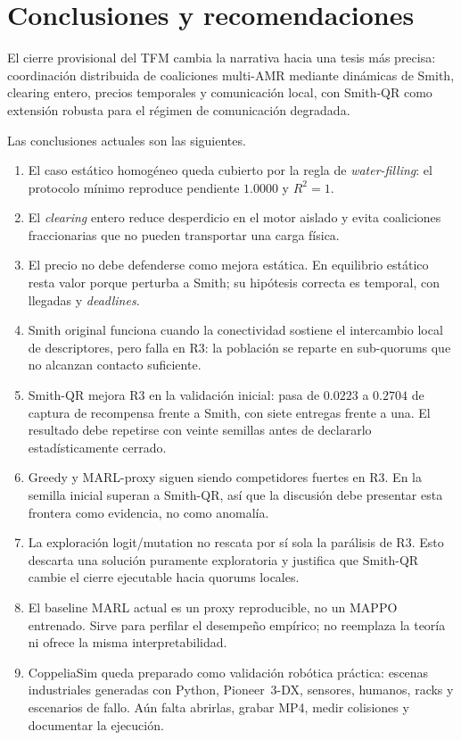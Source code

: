 \section{Conclusiones y recomendaciones}
\label{sec:conclusiones}

El cierre provisional del TFM cambia la narrativa hacia una tesis más precisa:
coordinación distribuida de coaliciones multi-AMR mediante dinámicas de Smith, clearing
entero, precios temporales y comunicación local, con Smith-QR como extensión robusta
para el régimen de comunicación degradada.

Las conclusiones actuales son las siguientes.

\begin{enumerate}
  \item El caso estático homogéneo queda cubierto por la regla de
  \emph{water-filling}: el protocolo mínimo reproduce pendiente $1.0000$ y $R^2=1$.
  \item El \emph{clearing} entero reduce desperdicio en el motor aislado y evita
  coaliciones fraccionarias que no pueden transportar una carga física.
  \item El precio no debe defenderse como mejora estática. En equilibrio estático resta
  valor porque perturba a Smith; su hipótesis correcta es temporal, con llegadas y
  \emph{deadlines}.
  \item Smith original funciona cuando la conectividad sostiene el intercambio local de
  descriptores, pero falla en R3: la población se reparte en sub-quorums que no alcanzan
  contacto suficiente.
  \item Smith-QR mejora R3 en la validación inicial: pasa de $0.0223$ a $0.2704$ de
  captura de recompensa frente a Smith, con siete entregas frente a una. El resultado
  debe repetirse con veinte semillas antes de declararlo estadísticamente cerrado.
  \item Greedy y MARL-proxy siguen siendo competidores fuertes en R3. En la semilla
  inicial superan a Smith-QR, así que la discusión debe presentar esta frontera como
  evidencia, no como anomalía.
  \item La exploración logit/mutation no rescata por sí sola la parálisis de R3. Esto
  descarta una solución puramente exploratoria y justifica que Smith-QR cambie el cierre
  ejecutable hacia quorums locales.
  \item El baseline MARL actual es un proxy reproducible, no un MAPPO entrenado. Sirve
  para perfilar el desempeño empírico; no reemplaza la teoría ni ofrece la misma
  interpretabilidad.
  \item CoppeliaSim queda preparado como validación robótica práctica: escenas
  industriales generadas con Python, Pioneer~3-DX, sensores, humanos, racks y escenarios
  de fallo. Aún falta abrirlas, grabar MP4, medir colisiones y documentar la ejecución.
\end{enumerate}

